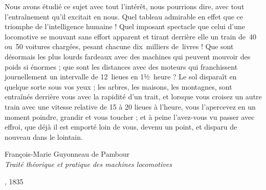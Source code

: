 \thispagestyle{empty}

{{\color{gray}\scalebox{3}{«}} Nous avons étudié ce sujet avec tout l’intérêt, nous pourrions dire, avec tout l’entraînement qu’il excitait en nous. Quel tableau admirable en effet que ce triomphe de l’intelligence humaine ! Quel imposant spectacle que celui d’une locomotive se mouvant sans effort apparent et tirant derrière elle un train de~40 ou~50 voitures chargées, pesant chacune dix~milliers de~livres ! Que sont désormais les plus lourds fardeaux avec des machines qui peuvent mouvoir des poids si énormes ; que sont les distances avec des moteurs qui franchissent journellement un intervalle de 12~lieues en  1½~heure ? Le sol disparaît en quelque sorte sous vos yeux ; les arbres, les maisons, les montagnes, sont entraînés derrière vous avec la rapidité d’un trait, et lorsque vous croisez un autre train avec une vitesse relative de 15 à 20 lieues à l’heure, vous l’apercevez en un moment poindre, grandir et vous toucher ; et à peine l’avez-vous vu passer avec effroi, que déjà il est emporté loin de vous, devenu un point, et disparu de nouveau dans le lointain. \raisebox{-1.6ex}{{\color{gray}\scalebox{3}{»}}}}

{\small\begin{flushright}
François-Marie Guyonneau de Pambour\\
\textit{Traité théorique et pratique des machines locomotives}~\begin{scriptsize}\cite{pambour1835}\end{scriptsize}, 1835
\end{flushright}}
\vspace{1cm}
\restoregeometry
